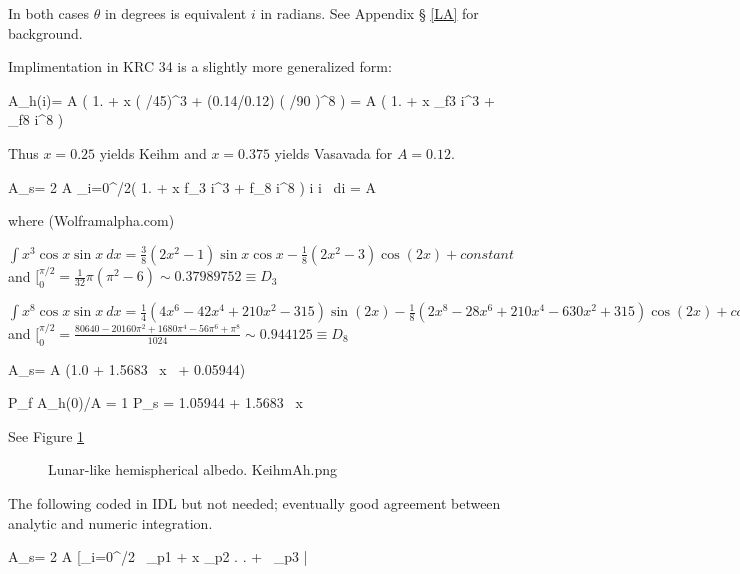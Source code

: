 In both cases $\theta$ in degrees is equivalent $i$ in radians. See Appendix \S
\ref{LA} for background.

Implimentation in KRC 34 is a slightly more generalized form:

 \qbn A_h(i)= A \left( 1. + x \left( \theta /45\right)^3 + (0.14/0.12) \left( \theta /90 \right)^8 \right) = A \left( 1. + x _{f3} i^3
+  _{f8}  i^8 \right)   \qen

Thus $x=0.25$ yields Keihm and  $x=0.375$ yields Vasavada for $A=0.12$.

\qb A_s=  2 A  \int_{i=0}^{\pi/2}\left( 1. + x f_3 i^3 + f_8 i^8 \right) \cos i \sin i \ di 
 = A \left[ 1. + 2f_3 D_3 \ x \ + 2f_8 D_8 \right] \qe 

where  (Wolframalpha.com)

$\int x^3 \cos x \sin x \  dx = \frac{3}{8} (2 x^2-1) \sin x \cos x -\frac{1}{8}(2 x^2-3) \cos(2 x)+constant$ and 
$ [_0^{\pi/2} = \frac{1}{32} \pi ( \pi^2-6) \sim 0.37989752  \equiv  D_3 $

$ \int x^8 \cos x \sin x \ dx = \frac{1}{4}(4 x^6 -42 x^4 +210 x^2 -315) \sin(2 x)-\frac{1}{8} (2 x^8 -28 x^6 +210 x^4 -630 x^2 +315) \cos (2 x)+constant$ 
and $ [_0^{\pi/2} = \frac{80640-20160 \pi^2+1680 \pi^4-56 \pi^6+\pi^8}{1024} \sim 0.944125 \equiv  D_8 $

\qbn A_s=  A \left(1.0 + 1.5683 \ x \ + 0.05944\right) 

\qbn P_f \equiv A_h(0)/A = 1  \mc{;} P_s  \equiv  {}=  1.05944 + 1.5683 \ x 

 See Figure \ref{KeihmAh} 
 
\begin{figure}[!ht] 
\caption[Lunar-like albedo]{Lunar-like hemispherical albedo.
\label{KeihmAh} KeihmAh.png }
\end{figure} 

\small

The following coded in IDL but not needed; eventually good agreement between
analytic and numeric integration.

\qbn A_s=  2 A \left[_{i=0}^{\pi/2} \ _{p1} 
+  x _{p2}  \right. 
\qb  \left. + \ _{p3} \right| \qe 

